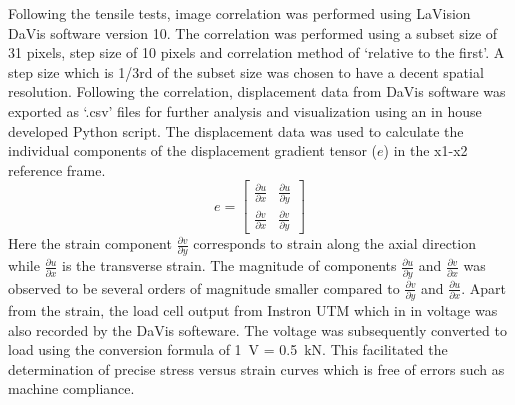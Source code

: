 \documentclass[11pt]{article} %
\begin{document}
Following the tensile tests, image correlation was performed using LaVision DaVis software version 10. The correlation was performed using a subset size of 31 pixels, step size of 10 pixels and correlation method of ‘relative to the first’. A step size which is 1/3rd of the subset size was chosen to have a decent spatial resolution. Following the correlation, displacement data from DaVis software was exported as ‘.csv’ files for further analysis and visualization using an in house developed Python script. The displacement data was used to calculate the individual components of the displacement gradient tensor ($e$) in the x1-x2 reference frame.
\begin{equation}
	e = \begin{bmatrix}
			\frac{\partial u}{\partial x} & \frac{\partial u}{\partial y} \\ 
			\frac{\partial v}{\partial x} & \frac{\partial v}{\partial y}
		\end{bmatrix}
\end{equation}
Here the strain component $\frac{\partial v}{\partial y}$ corresponds to strain along the axial direction while $\frac{\partial u}{\partial x}$ is the transverse strain. The magnitude of components $\frac{\partial u}{\partial y}$ and $\frac{\partial v}{\partial x}$ was observed to be several orders of magnitude smaller compared to $\frac{\partial v}{\partial y}$ and $\frac{\partial u}{\partial x}$. Apart from the strain, the load cell output from Instron UTM which in in voltage was also recorded by the DaVis softeware. The voltage was subsequently converted to load using the conversion formula of \SI{1}{\volt} = \SI{0.5}{\kilo\newton}. This facilitated the determination of precise stress versus strain curves which is free of errors such as machine compliance. 
\end{document}
